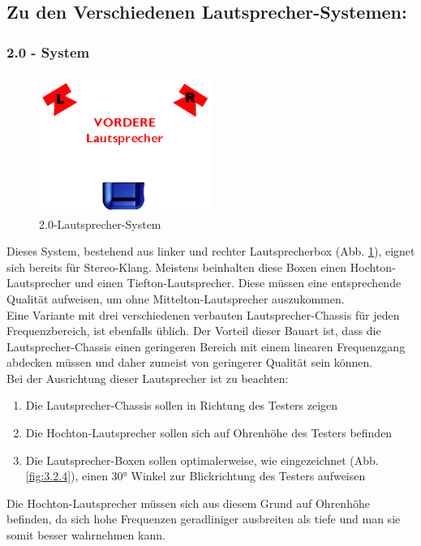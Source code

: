 \newpage
\subsection*{Zu den Verschiedenen Lautsprecher-Systemen:}
\subsubsection*{2.0 - System}
\begin{figure} [H]
	\centering
	\includegraphics[width=0.5\textwidth]{img/Grundlagen/Mehrweg-Lautsprechersysteme/DOLBYDigital20-cut.jpg}
	\caption[2.0-Lautsprecher-System]{2.0-Lautsprecher-System\footnotemark}
	\label{fig:3.2.3}
\end{figure}

Dieses System, bestehend aus linker und rechter Lautsprecherbox (Abb. \ref{fig:3.2.3}), eignet sich bereits für Stereo-Klang.
Meistens beinhalten diese Boxen einen Hochton-Lautsprecher und einen Tiefton-Lautsprecher.
Diese müssen eine entsprechende Qualität aufweisen, um ohne Mittelton-Lautsprecher auszukommen.\\
Eine Variante mit drei verschiedenen verbauten Lautsprecher-Chassis für jeden Frequenzbereich, ist ebenfalls üblich.
Der Vorteil dieser Bauart ist, dass die Lautsprecher-Chassis einen geringeren Bereich mit einem linearen Frequenzgang abdecken müssen und daher zumeist von geringerer Qualität sein können.\\
Bei der Ausrichtung dieser Lautsprecher ist zu beachten:
\begin{enumerate}
	\item Die Lautsprecher-Chassis sollen in Richtung des Testers zeigen
	\item Die Hochton-Lautsprecher sollen sich auf Ohrenhöhe des Testers befinden
	\item Die Lautsprecher-Boxen sollen optimalerweise, wie eingezeichnet (Abb. \ref{fig:3.2.4}), einen 30° Winkel zur Blickrichtung des Testers aufweisen
\end{enumerate}
Die Hochton-Lautsprecher müssen sich aus diesem Grund auf Ohrenhöhe befinden, da sich hohe Frequenzen geradliniger ausbreiten als tiefe und man sie somit besser wahrnehmen kann.

